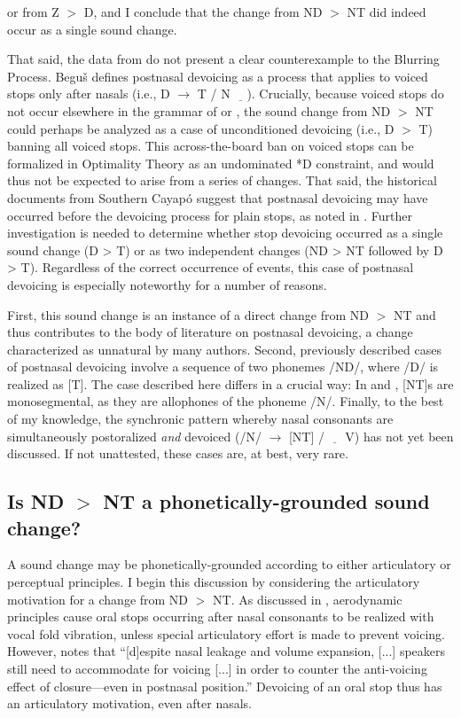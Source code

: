 \documentclass[output=paper,hidelinks]{langscibook}
\begin{document}
or from Z $>$ D, and I conclude that the change from ND $>$ NT did indeed occur as a single sound change.

That said, the data from  do not present a clear counterexample to the Blurring Process. Begu\v{s} defines postnasal devoicing as a process that applies to voiced stops only after nasals (i.e., D $\rightarrow$ T / N $\underline{\hspace{1em}}$). Crucially, because voiced stops do not occur elsewhere in the grammar of  or , the sound change from ND $>$ NT could perhaps be analyzed as a case of unconditioned devoicing (i.e., D $>$ T) banning all voiced stops. This across-the-board ban on voiced stops can be formalized in Optimality Theory as an undominated *D constraint, and would thus not be expected to arise from a series of changes. That said, the historical documents from Southern Cayap\'o suggest that postnasal devoicing may have occurred before the devoicing process for plain stops, as noted in . Further investigation is needed to determine whether stop devoicing occurred as a single sound change (D > T) or as two independent changes (ND > NT followed by D > T). Regardless of the correct occurrence of events, this case of postnasal devoicing is especially noteworthy for a number of reasons.

First, this sound change is an instance of a direct change from ND $>$ NT and thus contributes to the body of literature on postnasal devoicing, a change characterized as unnatural by many authors. Second, previously described cases of postnasal devoicing involve a sequence of two phonemes /ND/, where /D/ is realized as [T]. The case described here differs in a crucial way: In  and , [NT]s are monosegmental, as they are allophones of the phoneme /N/. Finally, to the best of my knowledge, the synchronic pattern whereby nasal consonants are simultaneously postoralized \textit{and} devoiced (/N/ $\rightarrow$ [NT] / $\underline{\hspace{1em}}$ V) has not yet been discussed. If not unattested, these cases are, at best, very rare.


\subsection{Is ND $>$ NT a phonetically-grounded sound change?}\label{sec:lapierre:4.2}

A sound change may be phonetically-grounded according to either articulatory or perceptual principles. I begin this discussion by considering the articulatory motivation for a change from ND $>$ NT. As discussed in , aerodynamic principles cause oral stops occurring after nasal consonants to be realized with vocal fold vibration, unless special articulatory effort is made to prevent voicing. However, \citet[104]{Begus2019} notes that ``[d]espite nasal leakage and volume expansion, [...] speakers still need to accommodate for voicing [...] in order to counter the anti-voicing effect of closure---even in postnasal position.'' Devoicing of an oral stop thus has an articulatory motivation, even after nasals. 
\end{document}
